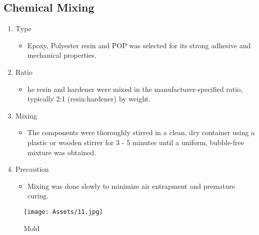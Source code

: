 \subsection{Chemical Mixing}
\begin{enumerate}
    \item  Type
    \begin{itemize}
        \item Epoxy, Polyester resin and POP was selected for its strong adhesive and mechanical properties. 
    \end{itemize}
    \item Ratio
    \begin{itemize}
        \item he resin and hardener were mixed in the manufacturer-specified ratio, typically 2:1 (resin:hardener) by weight.   
    \end{itemize}
    \item  Mixing
    \begin{itemize}
        \item The components were thoroughly stirred in a clean, dry container using a plastic or wooden stirrer for 3 - 5 minutes until a uniform, bubble-free mixture was obtained. 
    \end{itemize}
    \item  Precaution 
    \begin{itemize}
        \item Mixing was done slowly to minimize air entrapment and premature curing.
    \end{itemize}
\end{enumerate}

\begin{figure}[H]
    \centering
    \texttt{[image: Assets/11.jpg]}
    \caption{Mold}
    \label{fig:placeholder}
\end{figure}

